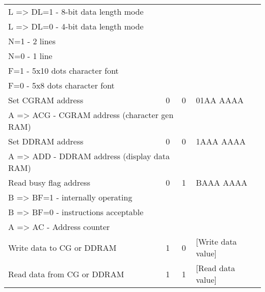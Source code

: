 \documentclass[12pt,a4paper,twoside,openright,slovene]{book}
\begin{document}
\begin{footnotesize}
\begin{table}[h]
\begin{tabular}{lccl}
              \multicolumn{3}{l}{\quad L => DL=1 - 8-bit data length mode} \\
              \multicolumn{3}{l}{\quad L => DL=0 - 4-bit data length mode} \\
              \multicolumn{3}{l}{\quad N=1 - 2 lines} \\
              \multicolumn{3}{l}{\quad N=0 - 1 line} \\
              \multicolumn{3}{l}{\quad F=1 - 5x10 dots character font} \\
              \multicolumn{3}{l}{\quad F=0 - 5x8 dots character font} \\ \hline
            Set CGRAM address                           &0      & 0     & 01AA AAAA \\
              \multicolumn{3}{l}{\quad A => ACG - CGRAM address (character gen RAM)} \\ \hline
            Set DDRAM address                           & 0     & 0     & 1AAA AAAA \\
               \multicolumn{3}{l}{\quad A => ADD - DDRAM address (display data RAM)} \\ \hline
            Read busy flag address                      & 0     & 1     & BAAA AAAA \\
            \multicolumn{3}{l}{\quad B => BF=1 - internally operating} \\
            \multicolumn{3}{l}{\quad B => BF=0 - instructions acceptable} \\
            \multicolumn{3}{l}{\quad A => AC - Address counter} \\ \hline
            Write data to CG or DDRAM                   & 1     & 0     & [Write data value] \\ \hline
            Read data from CG or DDRAM                  & 1     & 1     & [Read data value] \\ \hline
        \end{tabular}
    \end{table}
\end{footnotesize}
\end{document}
